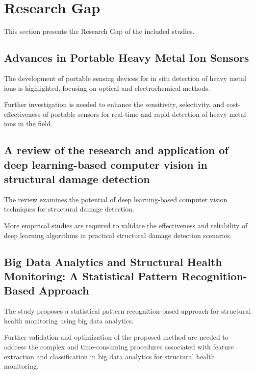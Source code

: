 \documentclass[journal, a4paper]{IEEEtran}
\begin{document}
\section{Research Gap}
This section presents the Research Gap of the included studies. 

\subsection{Advances in Portable Heavy Metal Ion Sensors}
The development of portable sensing devices for in situ detection of heavy metal ions is highlighted,
focusing on optical and electrochemical methods.

\begin{description}[style=standard, font=\normalfont]
  \item[Research gap:] Further investigation is needed to enhance the sensitivity, selectivity, and cost-effectiveness of portable sensors for real-time and rapid detection of heavy metal ions in the field.
\end{description}


\subsection{A review of the research and application of deep learning-based computer vision in structural damage detection} 
The review examines the potential of deep learning-based computer vision techniques for structural damage detection. 
\begin{description}[style=standard, font=\normalfont]
  \item[Research gap:] More empirical studies are required to validate the effectiveness and reliability of deep learning algorithms in practical structural damage detection scenarios.
\end{description}


\subsection{Big Data Analytics and Structural Health Monitoring: A Statistical Pattern Recognition-Based Approach}
The study proposes a statistical pattern recognition-based approach for structural health monitoring using big data analytics. 

\begin{description}[style=standard, font=\normalfont]
  \item[Research gap:] Further validation and optimization of the proposed method are needed to address the complex and time-consuming procedures associated with feature extraction and classification in big data analytics for structural health monitoring.
\end{description}
\end{document}
